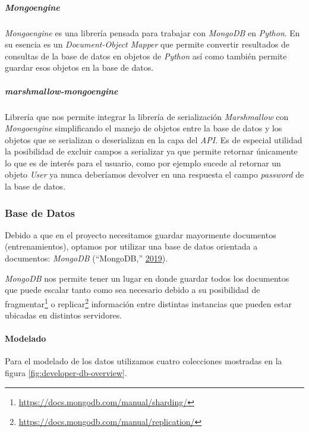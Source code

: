 \documentclass[12pt,a4paper,]{scrartcl}
\let\oldparagraph\paragraph
\renewcommand{\paragraph}[1]{\oldparagraph{#1}\mbox{}}
\let\oldsubparagraph\subparagraph
\renewcommand{\subparagraph}[1]{\oldsubparagraph{#1}\mbox{}}
\let\rmarkdownfootnote\footnote%
\def\footnote{\protect\rmarkdownfootnote}
\begin{document}
\hypertarget{mongoengine}{%
\subparagraph{\texorpdfstring{\emph{Mongoengine}}{Mongoengine}}\label{mongoengine}}

\emph{Mongoengine} es una librería pensada para trabajar con \emph{MongoDB} en \emph{Python}. En su esencia es un \emph{Document-Object Mapper} que permite convertir resultados de consultas de la base de datos en objetos de \emph{Python} así como también permite guardar esos objetos en la base de datos.

\hypertarget{marshmallow-mongoengine}{%
\subparagraph{\texorpdfstring{\emph{marshmallow-mongoengine}}{marshmallow-mongoengine}}\label{marshmallow-mongoengine}}

Librería que nos permite integrar la librería de serialización \emph{Marshmallow} con \emph{Mongoengine} simplificando el manejo de objetos entre la base de datos y los objetos que se serializan o deserializan en la capa del \emph{API}. Es de especial utilidad la posibilidad de excluir campos a serializar ya que permite retornar únicamente lo que es de interés para el usuario, como por ejemplo sucede al retornar un objeto \emph{User} ya nunca deberíamos devolver en una respuesta el campo \emph{password} de la base de datos.

\hypertarget{MongoDBDev}{%
\subsubsection{Base de Datos}\label{MongoDBDev}}

Debido a que en el proyecto necesitamos guardar mayormente documentos (entrenamientos), optamos por utilizar una base de datos orientada a documentos: \emph{MongoDB} (``MongoDB,'' \protect\hyperlink{ref-mongodb}{2019}).

\emph{MongoDB} nos permite tener un lugar en donde guardar todos los documentos que puede escalar tanto como sea necesario debido a su posibilidad de fragmentar\footnote{\url{https://docs.mongodb.com/manual/sharding/}} o replicar\footnote{\url{https://docs.mongodb.com/manual/replication/}} información entre distintas instancias que pueden estar ubicadas en distintos servidores.

\hypertarget{modelado}{%
\paragraph{Modelado}\label{modelado}}

Para el modelado de los datos utilizamos cuatro colecciones mostradas en la figura \ref{fig:developer-db-overview}.
\end{document}
